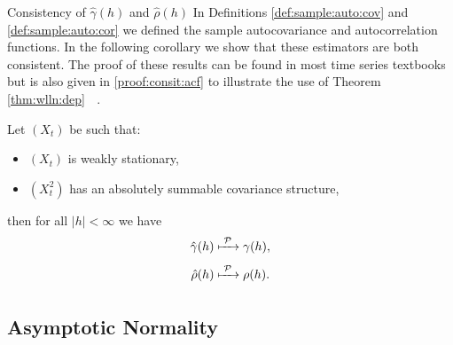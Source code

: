 \documentclass[envcountsect,usenames,dvipsnames]{beamer}
\theoremstyle{mystyle}
\begin{document}
\begin{frame}{Consistency of $\hat{\gamma}(h)$ and $\hat{\rho}(h)$}
\small
   In Definitions \ref{def:sample:auto:cov} and \ref{def:sample:auto:cor} we defined the sample autocovariance and autocorrelation functions. In the following corollary we show that these estimators are both consistent. The proof of these results can be found in most time series textbooks but is also given in \ref{proof:consit:acf} to illustrate the use of Theorem \ref{thm:wlln:dep} $\;$ \hyperlink{proof:consit:acf}{}.
   
   \begin{Corollary}
   \label{coro:consist:acf}
   Let $(X_t)$ be such that:
   \begin{itemize}
       \item $(X_t)$ is weakly stationary,
       \item $(X_t^2)$ has an absolutely summable covariance structure,
   \end{itemize}
   then for all $|h| < \infty$ we have 
   \begin{equation*}
    \begin{aligned}
             \hat{\gamma}(h) &\xmapsto[\;\;\;\;\; ]{\mathcal{P}} \gamma(h),\\
             \hat{\rho}(h) &\xmapsto[\;\;\;\;\; ]{\mathcal{P}} \rho(h).
    \end{aligned}
\end{equation*}
   \end{Corollary}
\end{frame}

\subsection{Asymptotic Normality}
\end{document}
